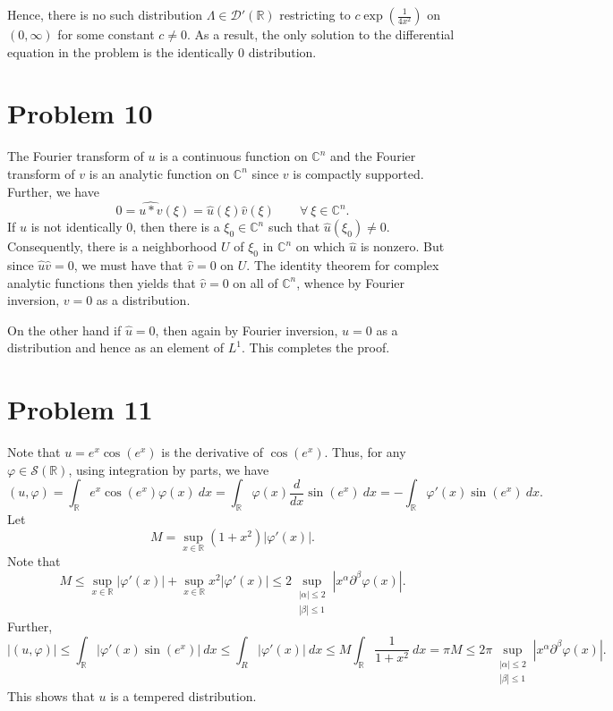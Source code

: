 \documentclass[10pt]{amsart}
\theoremstyle{thmstyle}
\theoremstyle{defstyle}
\newcommand{\R}{\mathbb{R}}
\newcommand{\bbC}{\mathbb{C}}
\newcommand{\scrS}{\mathscr S}
\newcommand{\wh}[1]{\widehat{#1}}
\renewcommand{\le}{\leqslant}
\begin{document}
Hence, there is no such distribution $\Lambda\in\mathscr D'(\R)$ restricting to $c\exp\left(\frac{1}{4x^2}\right)$ on $(0,\infty)$ for some constant $c\ne 0$. As a result, the only solution to the differential equation in the problem is the identically $0$ distribution.

\section{Problem 10}

The Fourier transform of $u$ is a continuous function on $\bbC^n$ and the Fourier transform of $v$ is an analytic function on $\bbC^n$ since $v$ is compactly supported. Further, we have 
\begin{equation*}
    0 = \wh{u\ast v}(\xi) = \wh u(\xi)\wh v(\xi)\qquad\forall~\xi\in\bbC^n.
\end{equation*}
If $\wh u$ is not identically $0$, then there is a $\xi_0\in\bbC^n$ such that $\wh u(\xi_0)\ne 0$. Consequently, there is a neighborhood $U$ of $\xi_0$ in $\bbC^n$ on which $\wh u$ is nonzero. But since $\wh u\wh v = 0$, we must have that $\wh v = 0$ on $U$. The identity theorem for complex analytic functions then yields that $\wh v = 0$ on all of $\bbC^n$, whence by Fourier inversion, $v = 0$ as a distribution.

On the other hand if $\wh u = 0$, then again by Fourier inversion, $u = 0$ as a distribution and hence as an element of $L^1$. This completes the proof.

\section{Problem 11}
Note that $u = e^x\cos(e^x)$ is the derivative of $\cos(e^x)$. Thus, for any $\varphi\in\scrS(\R)$, using integration by parts, we have 
\begin{equation*}
    (u,\varphi) = \int_{\R} e^x\cos (e^x)\varphi(x)~dx = \int_{\R}\varphi(x)\frac{d}{dx}\sin(e^x)~dx = - \int_{\R} \varphi'(x)\sin(e^x)~dx.
\end{equation*}
Let 
\begin{equation*}
    M = \sup_{x\in\R}(1 + x^2)|\varphi'(x)|.
\end{equation*}
Note that 
\begin{equation*}
    M\le \sup_{x\in\R} |\varphi'(x)| + \sup_{x\in\R} x^2|\varphi'(x)|\le 2\sup_{\substack{|\alpha|\le 2\\|\beta|\le 1}} |x^\alpha\partial^\beta\varphi(x)|.
\end{equation*}
Further, 
\begin{equation*}
    |(u,\varphi)|\le\int_{\R} |\varphi'(x)\sin(e^x)|~dx\le\int_R|\varphi'(x)|~dx\le M\int_{\R}\frac{1}{1 + x^2}~dx = \pi M\le 2\pi\sup_{\substack{|\alpha|\le 2\\|\beta|\le 1}} |x^\alpha\partial^\beta\varphi(x)|.
\end{equation*}
This shows that $u$ is a tempered distribution.
\end{document}
